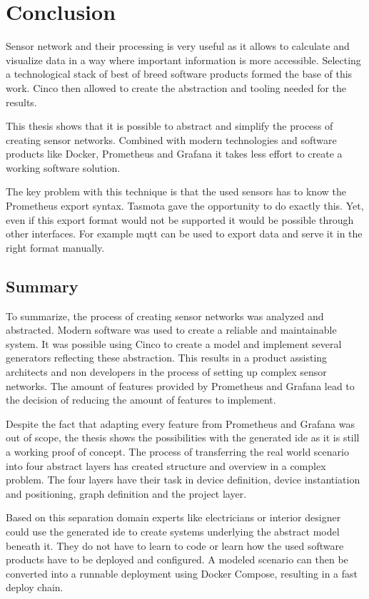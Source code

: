 \chapter{Conclusion}
\label{chapter:conclusion}
Sensor network and their processing is very useful as it allows to calculate and visualize data in a way where important information is more accessible. Selecting a technological stack of best of breed software products formed the base of this work. Cinco then allowed to create the abstraction and tooling needed for the results.

This thesis shows that it is possible to abstract and simplify the process of creating sensor networks. Combined with modern technologies and software products like Docker, Prometheus and Grafana it takes less effort to create a working software solution. 

The key problem with this technique is that the used sensors has to know the Prome\-theus export syntax. Tasmota gave the opportunity to do exactly this. Yet, even if this export format would not be supported it would be possible through other interfaces. For example \gls{mqtt} can be used to export data and serve it in the right format manually. 

\section{Summary}
To summarize, the process of creating sensor networks was analyzed and abstracted. Modern software was used to create a reliable and maintainable system. It was possible using Cinco to create a model and implement several generators reflecting these abstraction. This results in a product assisting architects and non developers in the process of setting up complex sensor networks. The amount of features provided by Prometheus and Grafana lead to the decision of reducing the amount of features to implement. 

Despite the fact that adapting every feature from Prometheus and Grafana was out of scope, the thesis shows the possibilities with the generated \gls{ide} as it is still a working proof of concept. The process of transferring the real world scenario into four abstract layers has created structure and overview in a complex problem. The four layers have their task in device definition, device instantiation and positioning, graph definition and the project layer. 

Based on this separation domain experts like electricians or interior designer could use the generated \gls{ide} to create systems underlying the abstract model beneath it. They do not have to learn to code or learn how the used software products have to be deployed and configured. A modeled scenario can then be converted into a runnable deployment using Docker Compose, resulting in a fast deploy chain.

